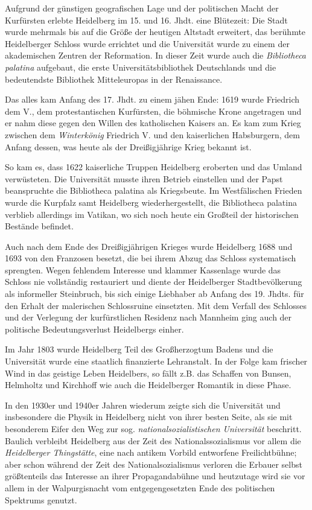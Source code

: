 Aufgrund der günstigen geografischen Lage und der politischen Macht der Kurfürsten erlebte Heidelberg im 15. und 16. Jhdt. eine Blütezeit: Die Stadt wurde mehrmals bis auf die Größe der heutigen Altstadt erweitert, das berühmte Heidelberger Schloss wurde errichtet und die Universität wurde zu einem der akademischen Zentren der Reformation. In dieser Zeit wurde auch die \textit{Bibliotheca palatina} aufgebaut, die erste Universitätsbibliothek Deutschlands und die bedeutendste Bibliothek Mitteleuropas in der Renaissance.

Das alles kam Anfang des 17. Jhdt. zu einem jähen Ende: 1619 wurde Friedrich dem V., dem protestantischen Kurfürsten, die böhmische Krone angetragen und er nahm diese gegen den Willen des katholischen Kaisers an. Es kam zum Krieg zwischen dem \textit{Winterkönig} Friedrich V. und den kaiserlichen Habsburgern, dem Anfang dessen, was heute als der Dreißigjährige Krieg bekannt ist.

So kam es, dass 1622 kaiserliche Truppen Heidelberg eroberten und das Umland verwüsteten. Die Universität musste ihren Betrieb einstellen und der Papst beanspruchte die Bibliotheca palatina als Kriegsbeute. Im Westfälischen Frieden wurde die Kurpfalz samt Heidelberg wiederhergestellt, die Bibliotheca palatina verblieb allerdings im Vatikan, wo sich noch heute ein Großteil der historischen Bestände befindet.

Auch nach dem Ende des Dreißigjährigen Krieges wurde Heidelberg 1688 und 1693 von den Franzosen besetzt, die bei ihrem Abzug das Schloss systematisch sprengten. Wegen fehlendem Interesse und klammer Kassenlage wurde das Schloss nie vollständig restauriert und diente der Heidelberger Stadtbevölkerung als informeller Steinbruch, bis sich einige Liebhaber ab Anfang des 19. Jhdts. für den Erhalt der malerischen Schlossruine einsetzten. Mit dem Verfall des Schlosses und der Verlegung der kurfürstlichen Residenz nach Mannheim ging auch der politische Bedeutungsverlust Heidelbergs einher.

Im Jahr 1803 wurde Heidelberg Teil des Großherzogtum Badens und die Universität wurde eine staatlich finanzierte Lehranstalt. In der Folge kam frischer Wind in das geistige Leben Heidelbers, so fällt z.B. das Schaffen von Bunsen, Helmholtz und Kirchhoff wie auch die Heidelberger Romantik in diese Phase.

In den 1930er und 1940er Jahren wiederum zeigte sich die Universität und insbesondere die Physik in Heidelberg nicht von ihrer besten Seite, als sie mit besonderem Eifer den Weg zur sog. \textit{nationalsozialistischen Universität} beschritt. Baulich verbleibt Heidelberg aus der Zeit des Nationalssozialismus vor allem die \textit{Heidelberger Thingstätte}, eine nach antikem Vorbild entworfene Freilichtbühne; aber schon während der Zeit des Nationalsozialismus verloren die Erbauer selbst größtenteils das Interesse an ihrer Propagandabühne und heutzutage wird sie vor allem in der Walpurgisnacht vom entgegengesetzten Ende des politischen Spektrums genutzt.

